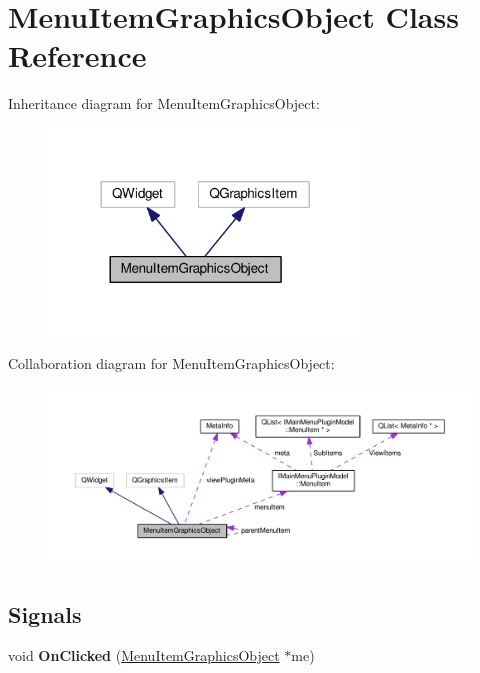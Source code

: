 \hypertarget{class_menu_item_graphics_object}{}\section{Menu\+Item\+Graphics\+Object Class Reference}
\label{class_menu_item_graphics_object}


Inheritance diagram for Menu\+Item\+Graphics\+Object\+:\nopagebreak
\begin{figure}[H]
\begin{center}
\leavevmode
\includegraphics[width=236pt]{class_menu_item_graphics_object__inherit__graph}
\end{center}
\end{figure}


Collaboration diagram for Menu\+Item\+Graphics\+Object\+:\nopagebreak
\begin{figure}[H]
\begin{center}
\leavevmode
\includegraphics[width=350pt]{class_menu_item_graphics_object__coll__graph}
\end{center}
\end{figure}
\subsection*{Signals}
\begin{DoxyCompactItemize}
\item 
void {\bfseries On\+Clicked} (\hyperlink{class_menu_item_graphics_object}{Menu\+Item\+Graphics\+Object} $\ast$me)\hypertarget{class_menu_item_graphics_object_a8cc186eece634847665b15f4ae58b426}{}\label{class_menu_item_graphics_object_a8cc186eece634847665b15f4ae58b426}

\end{DoxyCompactItemize}
